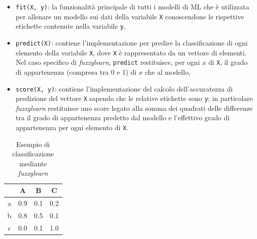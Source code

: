 \documentclass[12pt,italian]{report}
\begin{document}
\begin{itemize}
\item{\texttt{fit(X, y)}: la funzionalità principale di tutti i modelli di ML che è utilizzata per allenare un modello sui dati della variabile \texttt{X} conoscendone le rispettive etichette contenute nella variabile \texttt{y},}
\item{\texttt{predict(X)}: contiene l'implementazione per predire la classificazione di ogni elemento della variabile \texttt{X}, dove \texttt{X} è rappresentato da un vettore di elementi. Nel caso specifico di \emph{fuzzylearn}, \texttt{predict} restituisce, per ogni $x$ di \texttt{X}, il grado di appartenenza (compresa tra 0 e 1) di $x$  che  al modello,}
\item{\texttt{score(X, y)}: contiene l'implementazione del calcolo dell'accuratezza di predizione del vettore \texttt{X} sapendo che le relative etichette sono \texttt{y}; in particolare \emph{fuzzylearn} restituisce uno score legato alla somma dei quadrati delle differenze tra il grado di appartenenza predetto dal modello e l'effettivo grado di appartenenza per ogni elemento di \texttt{X}.}
\end{itemize}
\begin{table}[h!]
	\centering

		\begin{tabular}{c|c|c|c}
			\toprule 
			\multicolumn{1}{c|}{} & A   & B   & \multicolumn{1}{c}{C} \\ \midrule
			\multicolumn{1}{c|}{a} & 0.9 & 0.1 & 0.2                    \\
			\multicolumn{1}{c|}{b} & 0.8 & 0.5 & 0.1                    \\
			\multicolumn{1}{c|}{c} & 0.0 & 0.1 & 1.0                    \\ 
			\bottomrule
		\end{tabular}%
	\caption{Esempio di classificazione mediante \emph{fuzzylearn}}
	\label{tab:example_classification}
\end{table}
\end{document}
